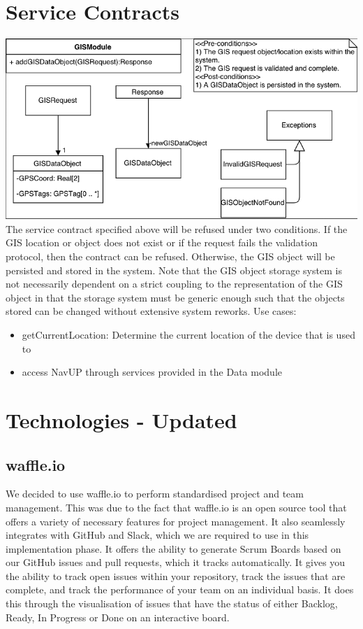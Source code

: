 \documentclass[a4paper,10pt]{article}
\begin{document}
	\section{Service Contracts}
	\includegraphics[scale=0.75]{GIS_Service_Contract.png}
	\vspace{0.5cm}\newline
	The service contract specified above will be refused under two conditions. If the GIS
	location or object does not exist or if the request fails the validation protocol, then the
	contract can be refused. Otherwise, the GIS object will be persisted and stored in the
	system. Note that the GIS object storage system is not necessarily dependent on a
	strict coupling to the representation of the GIS object in that the storage system must
	be generic enough such that the objects stored can be changed without extensive
	system reworks.\newline\newline
	Use cases:
	\begin{itemize}
		\item getCurrentLocation: Determine the current location of the device that is used to
		\item access NavUP through services provided in the Data module
	\end{itemize}
		
	
	\section{Technologies - Updated}
	\subsection{waffle.io}
		We decided to use waffle.io to perform standardised project and team management. This was due to the fact that waffle.io is an open source tool that offers a variety of necessary features for project management. It also seamlessly integrates with GitHub and Slack, which we are required to use in this implementation phase. It offers the ability to generate Scrum Boards based on our GitHub issues and pull requests, which it tracks automatically. It gives you the ability to track open issues within your repository, track the issues that are complete, and track the performance of your team on an individual basis. It does this through the visualisation of issues that have the status of either Backlog, Ready, In Progress or Done on an interactive board.
\end{document}
